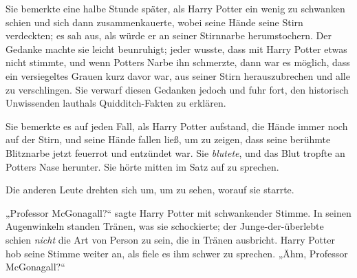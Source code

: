 Sie bemerkte eine halbe Stunde später, als Harry Potter ein wenig zu schwanken schien und sich dann zusammenkauerte, wobei seine Hände seine Stirn verdeckten; es sah aus, als würde er an seiner Stirnnarbe herumstochern. Der Gedanke machte sie leicht beunruhigt; jeder wusste, dass mit Harry Potter etwas nicht stimmte, und wenn Potters Narbe ihn schmerzte, dann war es möglich, dass ein versiegeltes Grauen kurz davor war, aus seiner Stirn herauszubrechen und alle zu verschlingen. Sie verwarf diesen Gedanken jedoch und fuhr fort, den historisch Unwissenden lauthals Quidditch-Fakten zu erklären.

Sie bemerkte es auf jeden Fall, als Harry Potter aufstand, die Hände immer noch auf der Stirn, und seine Hände fallen ließ, um zu zeigen, dass seine berühmte Blitznarbe jetzt feuerrot und entzündet war. Sie \emph{blutete}, und das Blut tropfte an Potters Nase herunter. Sie hörte mitten im Satz auf zu sprechen.

Die anderen Leute drehten sich um, um zu sehen, worauf sie starrte.

„Professor McGonagall?“ sagte Harry Potter mit schwankender Stimme.
In seinen Augenwinkeln standen Tränen, was sie schockierte; der Junge-der-überlebte schien \emph{nicht} die Art von Person zu sein, die in Tränen ausbricht. Harry Potter hob seine Stimme weiter an, als fiele es ihm schwer zu sprechen.
„Ähm, Professor McGonagall?“

